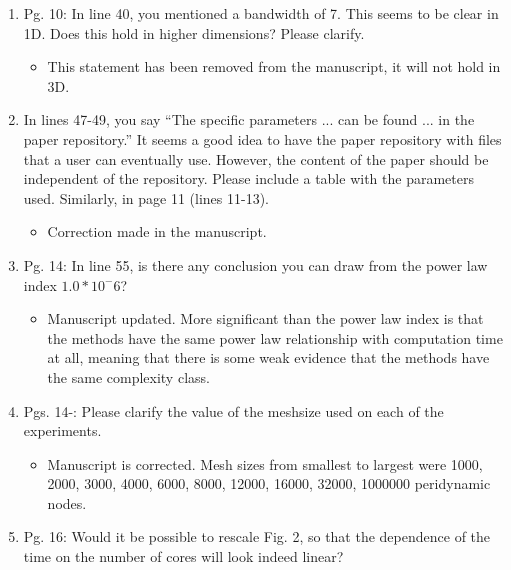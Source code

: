 \documentclass{article}
\begin{document}
\begin{enumerate}
\item
Pg. 10: In line 40, you mentioned a bandwidth of 7. This seems to be clear in 1D.
Does this hold in higher dimensions? Please clarify.

{\color{red}  
\begin{itemize}
    \item
        This statement has been removed from the manuscript, it will not hold in 3D.
  \end{itemize}}

    \item
        In lines 47-49, you say ``The speciﬁc parameters ... can be found ... in the
        paper repository.'' It seems a good idea to have the paper repository with ﬁles that a
        user can eventually use. However, the content of the paper should be independent
        of the repository. Please include a table with the parameters used. Similarly, in
        page 11 (lines 11-13).

{\color{red}  
\begin{itemize}
    \item
        Correction made in the manuscript. 
  \end{itemize}}

  \item
    Pg. 14: In line 55, is there any conclusion you can draw from the power law index
    $1.0 * 10^-6$?

{\color{red}  
\begin{itemize}
     \item
      Manuscript updated. More significant than the power law index is that the methods have the same power law relationship with computation time at all, meaning that there is some weak evidence that the methods have the same complexity class. 
  \end{itemize}}

  \item
    Pgs. 14-: Please clarify the value of the meshsize used on each of the experiments.

{\color{red}  
\begin{itemize}
     \item
         Manuscript is corrected. Mesh sizes from smallest to largest were 1000, 2000, 3000, 4000, 6000, 8000, 12000, 16000, 32000, 1000000 peridynamic nodes.
      \end{itemize}}

  \item
    Pg. 16: Would it be possible to rescale Fig. 2, so that the dependence of the time
    on the number of cores will look indeed linear?


\end{enumerate}
\end{document}
